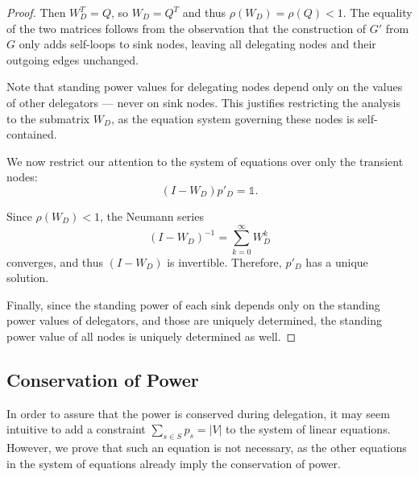 \begin{proof}
Then $W_D^T = Q$, so $W_D = Q^T$ and thus $\rho(W_D) = \rho(Q) < 1$. The equality of the two matrices follows from the observation that the construction of $G'$ from $G$ only adds self-loops to sink nodes, leaving all delegating nodes and their outgoing edges unchanged.

Note that standing power values for delegating nodes depend only on the values of other delegators — never on sink nodes. This justifies restricting the analysis to the submatrix $W_D$, as the equation system governing these nodes is self-contained.

We now restrict our attention to the system of equations over only the transient nodes:
\[
(I - W_D) p'_D = \mathbb{1}.
\]

Since $\rho(W_D) < 1$, the Neumann series
\[
(I - W_D)^{-1} = \sum_{k=0}^{\infty} W_D^k
\]
converges, and thus $(I - W_D)$ is invertible. Therefore, $p'_D$ has a unique solution.

Finally, since the standing power of each sink depends only on the standing power values of delegators, and those are uniquely determined, the standing power value of all nodes is uniquely determined as well.
\end{proof}

 \subsection{Conservation of Power}
 
 In order to assure that the power is conserved during delegation, it may seem intuitive to add a constraint $\sum_{s \in S} p_s = |V|$ to the system of linear equations. However, we prove that such an equation is not necessary, as the other equations in the system of equations already imply the conservation of power.
 
